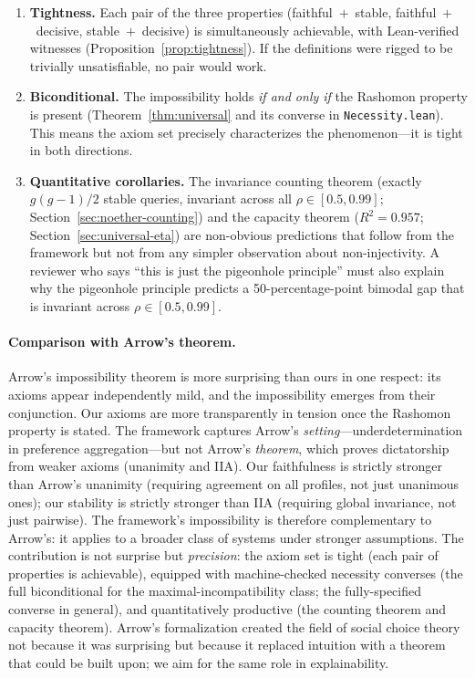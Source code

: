 \documentclass[11pt,a4paper]{article}
\begin{document}
\begin{enumerate}
  \item \textbf{Tightness.}  Each pair of the three properties
    (faithful~$+$~stable, faithful~$+$~decisive, stable~$+$~decisive) is
    simultaneously achievable, with Lean-verified witnesses
    (Proposition~\ref{prop:tightness}).  If the definitions were rigged to be
    trivially unsatisfiable, no pair would work.

  \item \textbf{Biconditional.}  The impossibility holds \emph{if and only if}
    the Rashomon property is present (Theorem~\ref{thm:universal} and
    its converse in \texttt{Necessity.lean}).  This means the axiom set
    precisely characterizes the phenomenon---it is tight in both
    directions.

  \item \textbf{Quantitative corollaries.}  The invariance counting theorem
    (exactly $g(g{-}1)/2$ stable queries, invariant across all
    $\rho \in [0.5, 0.99]$; Section~\ref{sec:noether-counting}) and the
    capacity theorem ($R^2 = 0.957$; Section~\ref{sec:universal-eta}) are non-obvious
    predictions that follow from the framework but not from any simpler
    observation about non-injectivity.  A reviewer who says ``this is just the
    pigeonhole principle'' must also explain why the pigeonhole principle
    predicts a 50-percentage-point bimodal gap that is invariant across
    $\rho \in [0.5, 0.99]$.
\end{enumerate}

\paragraph{Comparison with Arrow's theorem.}
Arrow's impossibility theorem \citep{arrow1951social} is more surprising than
ours in one respect: its axioms appear independently mild, and the impossibility
emerges from their conjunction.  Our axioms are more transparently in tension
once the Rashomon property is stated.  The framework captures Arrow's \emph{setting}---underdetermination in preference aggregation---but not Arrow's \emph{theorem}, which proves dictatorship from weaker axioms (unanimity and IIA).  Our faithfulness is strictly stronger than Arrow's unanimity (requiring agreement on all profiles, not just unanimous ones); our stability is strictly stronger than IIA (requiring global invariance, not just pairwise).  The framework's impossibility is therefore complementary to Arrow's: it applies to a broader class of systems under stronger assumptions.  The contribution is not surprise but
\emph{precision}: the axiom set is tight (each pair of properties is
achievable), equipped with machine-checked necessity converses (the full
biconditional for the maximal-incompatibility class; the fully-specified
converse in general), and quantitatively
productive (the counting theorem and capacity theorem).  Arrow's formalization
created the field of social choice theory not because it was surprising but
because it replaced intuition with a theorem that could be built upon; we aim
for the same role in explainability.
\end{document}
